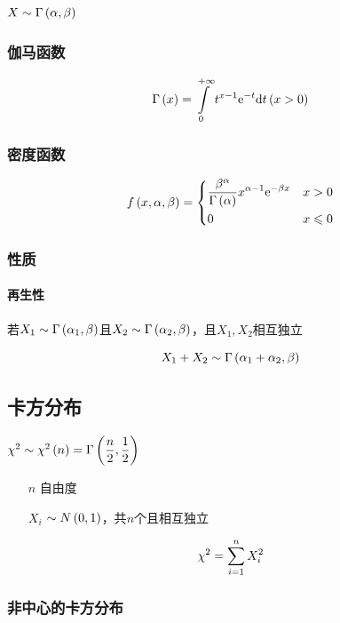 \documentclass{article}
\begin{document}
$X\sim\Gamma\left(\alpha,\beta\right)$

\subsubsection{伽马函数}

\[\Gamma\left(x\right)=\int\limits_0^{+\infty}t^{x-1}\mathrm e^{-t}\mathrm d t\left(x>0\right)\]

\subsubsection{密度函数}

\[f\left(x,\alpha,\beta\right)=
    \left\{\begin{aligned}
         & \frac{\beta^\alpha}{\Gamma\left(\alpha\right)}x^{\alpha-1}\mathrm e^{-\beta x} &  & x>0         \\
         & 0                                                              &  & x\leqslant0
    \end{aligned}\right.\]

\subsubsection{性质}

\paragraph{再生性}

若$X_1\sim\Gamma\left(\alpha_1,\beta\right)$且$X_2\sim\Gamma\left(\alpha_2,\beta\right)$，且$X_1,X_2$相互独立

\[X_1+X_2\sim\Gamma\left(\alpha_1+\alpha_2,\beta\right)\]

\subsection{卡方分布}

$\chi^2\sim\chi^2\left(n\right)=\Gamma\left(\dfrac n2,\dfrac12\right)$

\begin{enumerate}
    \item [$n$] 自由度
    \item [$X_i$] $\sim N\left(0,1\right)$，共$n$个且相互独立
\end{enumerate}

\[\chi^2=\sum\limits_{i=1}^n X_i^2\]

\subsubsection{非中心的卡方分布}
\end{document}
